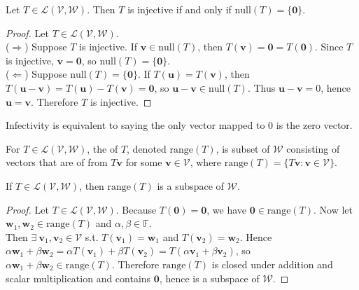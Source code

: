 \begin{proposition} \label{prop:tinjectiveiifnullteqzero} Let $T \in \mathcal{L}(\mathcal{V}, \mathcal{W})$. Then $T$ is injective if and only if $\text{null}(T) = \{ \mathbf{0} \}$.
\begin{proof} Let $T \in \mathcal{L}(\mathcal{V}, \mathcal{W})$.\\
($\Rightarrow$) Suppose $T$ is injective. If $\mathbf{v} \in \text{null}(T)$, then $T(\mathbf{v}) = \mathbf{0} = T(\mathbf{0})$. Since $T$ is injective, $\mathbf{v} = \mathbf{0}$, so $\text{null}(T) = \{ \mathbf{0} \}$.\\
($\Leftarrow$) Suppose $\text{null}(T) = \{ \mathbf{0} \}$. If $T(\mathbf{u}) = T(\mathbf{v})$, then $T(\mathbf{u} - \mathbf{v}) = T (\mathbf{u}) - T (\mathbf{v}) = \mathbf{0}$, so $\mathbf{u} - \mathbf{v} \in \text{null}(T)$. Thus $\mathbf{u} - \mathbf{v} = \mathbf{}0$, hence $\mathbf{u} = \mathbf{v}$. Therefore $T$ is injective.
\end{proof}
\end{proposition}

Infectivity is equivalent to saying the only vector mapped to 0 is the zero vector.

\begin{definition} For $T \in \mathcal{L}(\mathcal{V}, \mathcal{W})$, the  of $T$, denoted $\text{range}(T)$, is subset of $\mathcal{W}$ consisting of vectors that are of from $T \mathbf{v}$ for some $\mathbf{v} \in \mathcal{V}$, where $\text{range}(T) = \{ T \mathbf{v} : \mathbf{v} \in \mathcal{V} \}$.
\end{definition}

\begin{proposition} If $T \in \mathcal{L}(\mathcal{V}, \mathcal{W})$, then $\text{range}(T)$ is a subspace of $\mathcal{W}$.
\begin{proof} Let $T \in \mathcal{L}(\mathcal{V}, \mathcal{W})$. Because $T(\mathbf{0}) = \mathbf{0}$, we have $\mathbf{0} \in \text{range}(T)$. Now let $\mathbf{w}_1, \mathbf{w}_2 \in \text{range}(T)$ and $\alpha, \beta \in \mathbb{F}$.\\
Then $\exists \ \mathbf{v}_1, \mathbf{v}_2 \in \mathcal{V}$ s.t. $T (\mathbf{v}_1) = \mathbf{w}_1$ and $T (\mathbf{v}_2) = \mathbf{w}_2$. Hence $\alpha \mathbf{w}_1 + \beta \mathbf{w}_2 = \alpha T(\mathbf{v}_1) + \beta T (\mathbf{v}_2) = T(\alpha \mathbf{v}_1 + \beta \mathbf{v}_2)$, so $\alpha \mathbf{w}_1 + \beta \mathbf{w}_2 \in \text{range}(T)$. Therefore $\text{range}(T)$ is closed under addition and scalar multiplication and contains $\mathbf{0}$, hence is a subspace of $\mathcal{W}$.
\end{proof}
\end{proposition}

